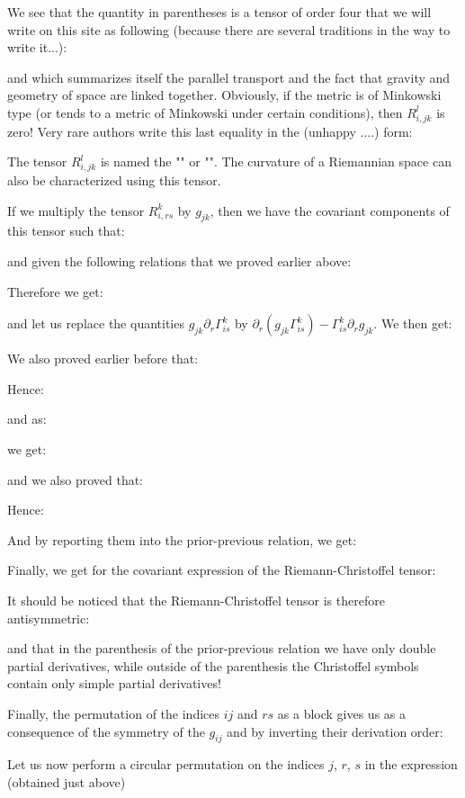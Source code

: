 	We see that the quantity in parentheses is a tensor of order four that we will write on this site as following (because there are several traditions in the way to write it...):
	
	and which summarizes itself the parallel transport and the fact that gravity and geometry of space are linked together. Obviously, if the metric is of Minkowski type (or tends to a metric of Minkowski under certain conditions), then $R_{i,jk}^l$ is zero! Very rare authors write this last equality in the (unhappy ....) form:
	
	The tensor $R_{i,jk}^l$ is named the "" or "". The curvature of a Riemannian space can also be characterized using this tensor.

	If we multiply the tensor $R_{i,rs}^k$ by $g_{jk}$, then we have the covariant components of this tensor such that:
	
	and given the following relations that we proved earlier above:
	
	Therefore we get:
	
	and let us replace the quantities $g_{jk}\partial_r\Gamma_{is}^k$ by $\partial_r\left(g_{jk}\Gamma_{is}^k\right)-\Gamma_{is}^k\partial_r g_{jk}$. We then get:
	
	We also proved earlier before that:
	
	Hence:
	
	and as:
	
	we get:
	
	and we also proved that:
	
	Hence:
	
	And by reporting them into the prior-previous relation, we get:
	
	Finally, we get for the covariant expression of the Riemann-Christoffel tensor:
	
	It should be noticed that the Riemann-Christoffel tensor is therefore antisymmetric:
	
	and that in the parenthesis of the prior-previous relation we have only double partial derivatives, while outside of the parenthesis the Christoffel symbols contain only simple partial derivatives!

	Finally, the permutation of the indices $ij$ and $rs$ as a block gives us as a consequence of the symmetry of the $g_{ij}$ and by inverting their derivation order:
	
	Let us now perform a circular permutation on the indices $j$, $r$, $s$ in the expression (obtained just above)
	
